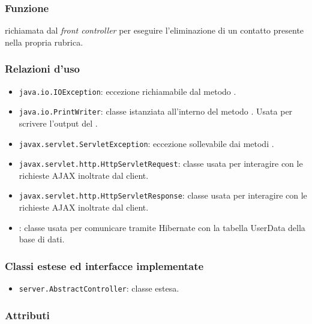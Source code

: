 

\subsubsection*{Funzione}
 richiamata dal \textit{front controller} per eseguire l'eliminazione di un contatto presente nella propria rubrica.

\subsubsection*{Relazioni d'uso}

\begin{itemize}
		\item \texttt{java.io.IOException}: eccezione richiamabile dal metodo .
	\item \texttt{java.io.PrintWriter}: classe istanziata all'interno del metodo . Usata per scrivere l'output del .
	\item \texttt{javax.servlet.ServletException}: eccezione sollevabile dai metodi .
	\item \texttt{javax.servlet.http.HttpServletRequest}: classe usata per interagire con le richieste AJAX inoltrate dal client.
	\item \texttt{javax.servlet.http.HttpServletResponse}: classe usata per interagire con le richieste AJAX inoltrate dal client. 
	\item {}: classe usata per comunicare tramite Hibernate con la tabella UserData della base di dati.
\end{itemize}

\subsubsection*{Classi estese ed interfacce implementate}
\begin{itemize}
	\item \texttt{server.AbstractController}: classe estesa.
\end{itemize}

\subsubsection*{Attributi}

